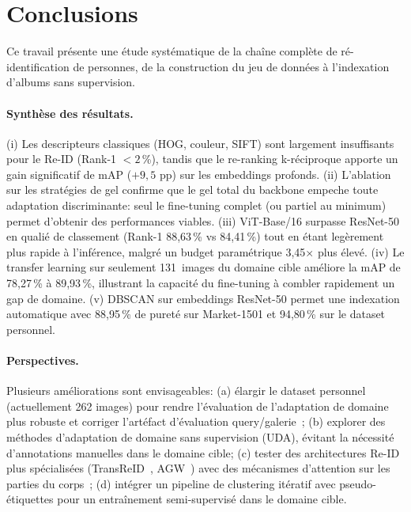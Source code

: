 \section{Conclusions}
\label{sec:conclusion}

Ce travail présente une étude systématique de la chaîne complète de ré-identification de personnes, de la construction du jeu de données à l'indexation d'albums sans supervision.

\paragraph{Synthèse des résultats.}
(i) Les descripteurs classiques (HOG, couleur, SIFT) sont largement insuffisants pour le Re-ID (Rank-1 $< 2$\,\%), tandis que le re-ranking k-réciproque apporte un gain significatif de mAP ($+9,5$ pp) sur les embeddings profonds. (ii) L'ablation sur les stratégies de gel confirme que le gel total du backbone empeche toute adaptation discriminante: seul le fine-tuning complet (ou partiel au minimum) permet d'obtenir des performances viables. (iii) ViT-Base/16 surpasse ResNet-50 en qualié de classement (Rank-1 88,63\,\% vs 84,41\,\%) tout en étant legèrement plus rapide à l'inférence, malgré un budget paramétrique 3,45$\times$ plus élevé. (iv) Le transfer learning sur seulement 131~images du domaine cible améliore la mAP de 78,27\,\% à 89,93\,\%, illustrant la capacité du fine-tuning à combler rapidement un gap de domaine. (v) DBSCAN sur embeddings ResNet-50 permet une indexation automatique avec 88,95\,\% de pureté sur Market-1501 et 94,80\,\% sur le dataset personnel.

\paragraph{Perspectives.}
Plusieurs améliorations sont envisageables: (a) élargir le dataset personnel (actuellement 262 images) pour rendre l'évaluation de l'adaptation de domaine plus robuste et corriger l'artéfact d'évaluation query/galerie~; (b) explorer des méthodes d'adaptation de domaine sans supervision (UDA), évitant la nécessité d'annotations manuelles dans le domaine cible; (c) tester des architectures Re-ID plus spécialisées (TransReID~\cite{he2021transreid}, AGW~\cite{ye2021deep}) avec des mécanismes d'attention sur les parties du corps~; (d) intégrer un pipeline de clustering itératif avec pseudo-étiquettes pour un entraînement semi-supervisé dans le domaine cible.
